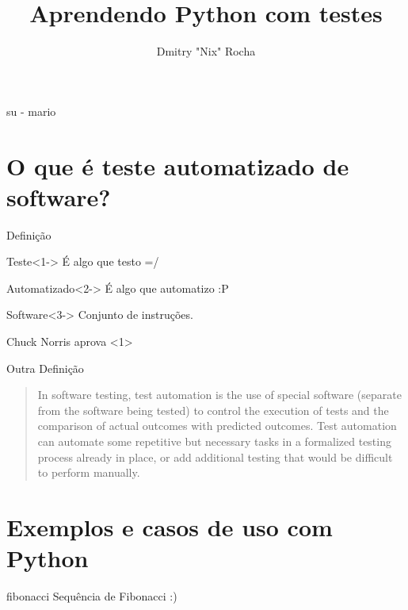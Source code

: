 \documentclass{beamer}
\author{Dmitry "Nix" Rocha}
\title{Aprendendo Python com testes}
\begin{document}
  \begin{frame}{}
    \titlepage
  \end{frame}

  \begin{frame}{su - mario}
    \tableofcontents
  \end{frame}

  \section{O que é teste automatizado de software?}

  \begin{frame}{Definição}
    \begin{block}{Teste}<1->
      É algo que testo =/
    \end{block}

    \begin{block}{Automatizado}<2->
      É algo que automatizo :P
    \end{block}

    \begin{block}{Software}<3->
      Conjunto de instruções.
    \end{block}
  \end{frame}

  \begin{frame}{Chuck Norris aprova}
    <1>
  \end{frame}

  \begin{frame}{Outra Definição}
\blockquote[{\cite[Wikipedia]{_test_2014}}]{
In software testing, test automation is the use of special software (separate
from the software being tested) to control the execution of tests and the
comparison of actual outcomes with predicted outcomes. Test automation can
automate some repetitive but necessary tasks in a formalized testing process
already in place, or add additional testing that would be difficult to perform
manually.
}
  \end{frame}

  \section{Exemplos e casos de uso com Python}

  \begin{frame}{fibonacci}
    Sequência de Fibonacci :)
  \end{frame}

  
  
\end{document}
